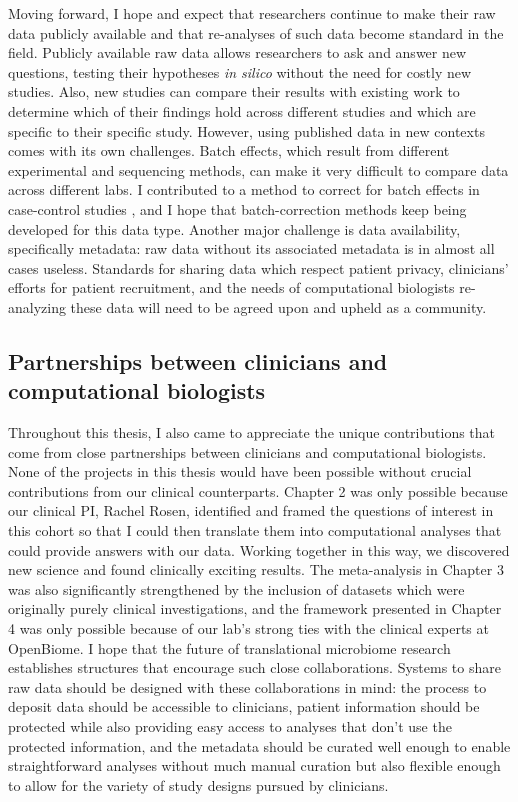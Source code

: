 Moving forward, I hope and expect that researchers continue to make their raw data publicly available and that re-analyses of such data become standard in the field.
Publicly available raw data allows researchers to ask and answer new questions, testing their hypotheses \textit{in silico} without the need for costly new studies.
Also, new studies can compare their results with existing work to determine which of their findings hold across different studies and which are specific to their specific study.
However, using published data in new contexts comes with its own challenges.
Batch effects, which result from different experimental and sequencing methods, can make it very difficult to compare data across different labs.
I contributed to a method to correct for batch effects in case-control studies \cite{gibbons-2018}, and I hope that batch-correction methods keep being developed for this data type.
Another major challenge is data availability, specifically metadata: raw data without its associated metadata is in almost all cases useless.
Standards for sharing data which respect patient privacy, clinicians' efforts for patient recruitment, and the needs of computational biologists re-analyzing these data will need to be agreed upon and upheld as a community.

\subsection{Partnerships between clinicians and computational biologists}

Throughout this thesis, I also came to appreciate the unique contributions that come from close partnerships between clinicians and computational biologists.
None of the projects in this thesis would have been possible without crucial contributions from our clinical counterparts.
Chapter 2 was only possible because our clinical PI, Rachel Rosen, identified and framed the questions of interest in this cohort so that I could then translate them into computational analyses that could provide answers with our data.
Working together in this way, we discovered new science and found clinically exciting results.
The meta-analysis in Chapter 3 was also significantly strengthened by the inclusion of datasets which were originally purely clinical investigations, and the framework presented in Chapter 4 was only possible because of our lab's strong ties with the clinical experts at OpenBiome.
I hope that the future of translational microbiome research establishes structures that encourage such close collaborations.
Systems to share raw data should be designed with these collaborations in mind: the process to deposit data should be accessible to clinicians, patient information should be protected while also providing easy access to analyses that don't use the protected information, and the metadata should be curated well enough to enable straightforward analyses without much manual curation but also flexible enough to allow for the variety of study designs pursued by clinicians.


